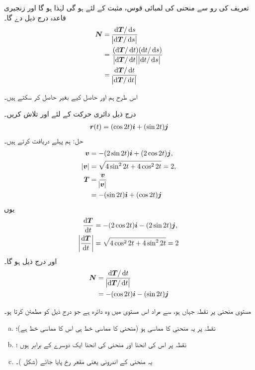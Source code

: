  تعریف کی رو سے  منحنی   کی لمبائی قوس،   مثبت  کے لئے ہو گی لہٰذا  ہو گا   اور زنجیری قاعدہ درج ذیل دے گا۔
\begin{align}
\kvec{N}&=\frac{\dif\kvec{T}/\dif s}{\abs{\dif\kvec{T}/\dif s}}\nonumber\\
&=\frac{(\dif\kvec{T}/\dif t)(\dif t/\dif s)}{\abs{\dif\kvec{T}/\dif t}\abs{\dif t/\dif s}}\nonumber\\
&=\frac{\dif\kvec{T}/\dif t}{\abs{\dif\kvec{T}/\dif t}}
\end{align}

اس طرح ہم  اور  حاصل کیے بغیر  حاصل کر سکتے ہیں۔


درج ذیل دائری حرکت کے لئے  اور  تلاش کریں۔
\begin{align*}
{\ensuremath{{\boldsymbol{r}}}}(t)=(\cos 2t){\boldsymbol{i}}+(\sin 2t){\boldsymbol{j}}
\end{align*}
حل:\quad
ہم پہلے  دریافت کرتے ہیں۔
\begin{align*}
{\ensuremath{{\boldsymbol{v}}}}&=-(2\sin 2t){\boldsymbol{i}}+(2\cos 2t){\boldsymbol{j}},\\
\abs{{{\boldsymbol{v}}}}&=\sqrt{4\sin^22t+4\cos^22t}=2,\\
{{\boldsymbol{T}}}&=\frac{{{\boldsymbol{v}}}}{\abs{{{\boldsymbol{v}}}}}\\
&=-(\sin 2t){\boldsymbol{i}}+(\cos 2t){\boldsymbol{j}}
\end{align*}
یوں
\begin{align*}
\frac{\dif \kvec{T}}{\dif t}&=-(2\cos 2t)\ai-(2\sin 2t)\aj,\\
\abs{\frac{\dif \kvec{T}}{\dif t}}&=\sqrt{4\cos^22t+4\sin^22t}=2
\end{align*}
اور درج ذیل ہو گا۔
\begin{align*}
\kvec{N}&=\frac{\dif \kvec{T}/\dif t}{\abs{\dif\kvec{T}/\dif t}}\\
&=-(\cos 2t)\ai-(\sin 2t)\aj
\end{align*}

مستوی منحنی پر نقطہ   جہاں  ہو،   سے مراد  اس مستوی میں وہ دائرہ ہے جو درج ذیل کو مطمئن کرتا ہو۔
\begin{enumerate}[a.]
\item
نقطہ  پر یہ منحنی کا مماسی ہو (منحنی کا مماسی خط ہی اس کا مماسی خط ہے)؛
\item
نقطہ  پر اس کی انحنا اور منحنی کی انحنا ایک دوسرے کے برابر ہوں ؛
\item
یہ منحنی کے اندرونی یعنی مقعر رخ  پایا جائے (شکل )۔
\end{enumerate}

